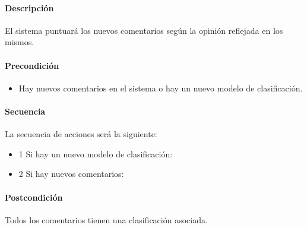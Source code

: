 \paragraph{Descripción} El sistema puntuará los nuevos comentarios según la opinión reflejada en los mismos.

\paragraph{Precondición} 
\begin{itemize}
	\item Hay nuevos comentarios en el sistema o hay un nuevo modelo de clasificación.
\end{itemize}

\paragraph{Secuencia} La secuencia de acciones será la siguiente:

\begin{itemize}
	\item 1 Si hay un nuevo modelo de clasificación:
	\item 2 Si hay nuevos comentarios:
\end{itemize}
	
\paragraph{Postcondición} Todos los comentarios tienen una clasificación asociada.
